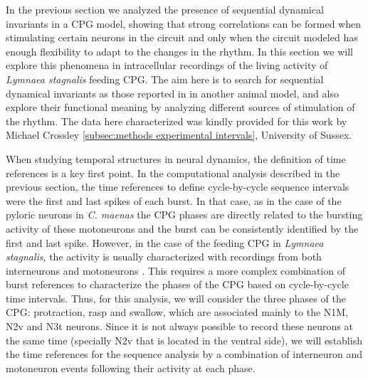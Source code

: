 In the previous section we analyzed the presence of sequential dynamical invariants in a CPG model, showing that strong correlations can be formed when stimulating certain neurons in the circuit and only when the circuit modeled has enough flexibility to adapt to the changes in the rhythm. In this section we will explore this phenomena in intracellular recordings of the living activity of \textit{Lymnaea stagnalis} feeding CPG. The aim here is to search for sequential dynamical invariants as those reported in \cite{elices_robust_2019} in another animal model, and also explore their functional meaning by analyzing different sources of stimulation of the rhythm. The data here characterized was kindly provided for this work by Michael Crossley \ref{subsec:methods experimental intervals}, University of Sussex.

When studying temporal structures in neural dynamics, the definition of time references is a key first point. In the computational analysis described in the previous section, the time references to define cycle-by-cycle sequence intervals were the first and last spikes of each burst. In that case, as in the case of the pyloric neurons in \textit{C. maenas} the CPG phases are directly related to the bursting activity of these motoneurons and the burst can be consistently identified by the first and last spike. However, in the case of the feeding CPG in \textit{Lymnaea stagnalis}, the activity is usually characterized with recordings from both interneurons and motoneurons \parencite{elliott_interactions_1985, staras_pattern-generating_1998, benjamin_distributed_2012}. This requires a more complex combination of burst references to characterize the phases of the CPG based on cycle-by-cycle time intervals. Thus, for this analysis, we will consider the three phases of the CPG: protraction, rasp and swallow, which are associated mainly to the N1M, N2v and N3t neurons. Since it is not always possible to record these neurons at the same time (specially N2v that is located in the ventral side), we will establish the time references for the sequence analysis by a combination of interneuron and motoneuron events following their activity at each phase. 

